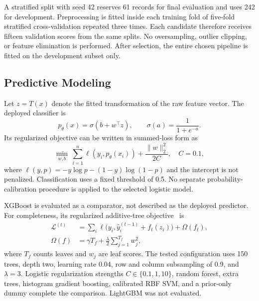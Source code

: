 \documentclass[journal]{IEEEtran}
\begin{document}
A stratified split with seed 42 reserves 61 records for final evaluation and uses 242 for development. Preprocessing is fitted inside each training fold of five-fold stratified cross-validation repeated three times. Each candidate therefore receives fifteen validation scores from the same splits. No oversampling, outlier clipping, or feature elimination is performed. After selection, the entire chosen pipeline is fitted on the development subset only.

\subsection{Predictive Modeling}
Let $z=T(x)$ denote the fitted transformation of the raw feature vector. The deployed classifier is
\begin{equation}
 p_\theta(x)=\sigma(b+w^\top z),\qquad
 \sigma(a)=\frac{1}{1+e^{-a}}.
\end{equation}
Its regularized objective can be written in summed-loss form as
\begin{equation}
 \min_{w,b}\ \sum_{i=1}^{n}\ell(y_i,p_\theta(x_i))
                  +\frac{\lVert w\rVert_2^2}{2C},\quad C=0.1,
\end{equation}
where $\ell(y,p)=-y\log p-(1-y)\log(1-p)$ and the intercept is not penalized. Classification uses a fixed threshold of 0.5. No separate probability-calibration procedure is applied to the selected logistic model.

XGBoost is evaluated as a comparator, not described as the deployed predictor. For completeness, its regularized additive-tree objective~\cite{chen2016} is
\begin{align}
 \mathcal{L}^{(t)}&=\sum_i\ell\big(y_i,\hat{y}^{(t-1)}_i+f_t(z_i)\big)
                      +\Omega(f_t),\\
 \Omega(f)&=\gamma T_f+\frac{\lambda}{2}\sum_{j=1}^{T_f}w_j^2,
\end{align}
where $T_f$ counts leaves and $w_j$ are leaf scores. The tested configuration uses 150 trees, depth two, learning rate 0.04, row and column subsampling of 0.9, and $\lambda=3$. Logistic regularization strengths $C\in\{0.1,1,10\}$, random forest, extra trees, histogram gradient boosting, calibrated RBF SVM, and a prior-only dummy complete the comparison. LightGBM was not evaluated.
\end{document}
